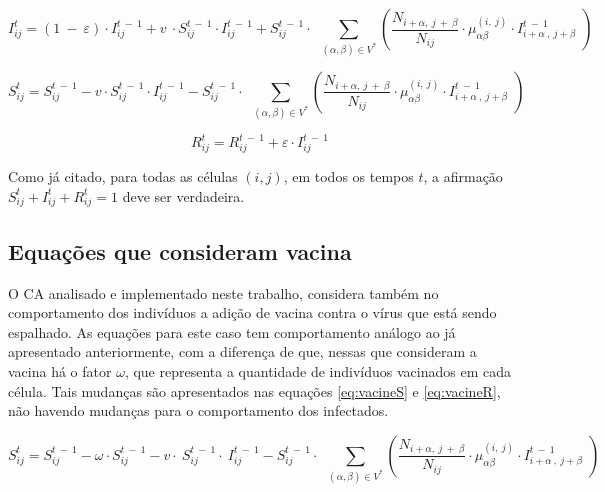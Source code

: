 \documentclass[
	11pt,				%
	openright,			%
	oneside,			%
	a4paper,			%
	english,			%
	french,				%
	spanish,			%
	brazil,				%
	]{abntex2}
\begin{document}
\begin{equation} \label{eq:infected}
I_{ij}^t=\left(1\:-\:\varepsilon \right)\cdot I_{ij}^{t\:-\:1}+v\:\cdot S_{ij}^{t\:-\:1}\cdot I_{ij}^{t\:-\:1}+S_{ij}^{t\:-\:1}\cdot \:\displaystyle \:\sum _{\left(\alpha ,\beta \right)\in V^{\ast }}^{ }\left(\frac{N_{i+\alpha ,\:j\:+\:\beta }}{N_{ij}}\cdot \mu _{\alpha \beta }^{\left(i,\:j\right)}\cdot I_{i+\alpha \:,\:j+\beta \:}^{t\:-\:1}\:\right)
\end{equation}

\begin{equation} \label{eq:susceptible}
S_{ij}^t=S_{ij}^{t\:-\:1}-v\cdot S_{ij}^{t\:-\:1}\cdot I_{ij}^{t\:-\:1}-S_{ij}^{t\:-\:1}\cdot \:\displaystyle \:\sum _{\left(\alpha ,\beta \right)\in V^{\ast }}^{ }\left(\frac{N_{i+\alpha ,\:j\:+\:\beta }}{N_{ij}}\cdot \mu _{\alpha \beta }^{\left(i,\:j\right)}\cdot I_{i+\alpha \:,\:j+\beta \:}^{t\:-\:1}\:\right)
\end{equation}

\begin{equation} \label{eq:recovered}
R_{ij}^t=R_{ij}^{t\:-\:1}+\varepsilon \cdot I_{ij}^{t\:-\:1}
\end{equation}

\par Como já citado, para todas as células $(i, j)$, em todos os tempos $t$, a afirmação $S_{ij}^t + I_{ij}^t + R_{ij}^t = 1$ deve ser verdadeira.

\subsection{Equações que consideram vacina}

\par O CA analisado e implementado neste trabalho, considera também no comportamento dos indivíduos a adição de vacina contra o vírus que está sendo espalhado. As equações para este caso tem comportamento análogo ao já apresentado anteriormente, com a diferença de que, nessas que consideram a vacina há o fator $\omega$, que representa a quantidade de indivíduos vacinados em cada célula. Tais mudanças são apresentados nas equações \ref{eq:vacineS} e \ref{eq:vacineR}, não havendo mudanças para o comportamento dos infectados.

\begin{equation} \label{eq:vacineS}
S_{ij}^t=S_{ij}^{t\:-\:1}-\omega \cdot S_{ij}^{t\:-\:1}-v\cdot \:S_{ij}^{t\:-\:1}\cdot \:I_{ij}^{t\:-\:1}-S_{ij}^{t\:-\:1}\cdot \:\displaystyle \:\sum _{\left(\alpha ,\beta \right)\in V^{\ast }}^{ }\left(\frac{N_{i+\alpha ,\:j\:+\:\beta }}{N_{ij}}\cdot \mu _{\alpha \beta }^{\left(i,\:j\right)}\cdot I_{i+\alpha \:,\:j+\beta \:}^{t\:-\:1}\:\right)
\end{equation}
\end{document}
